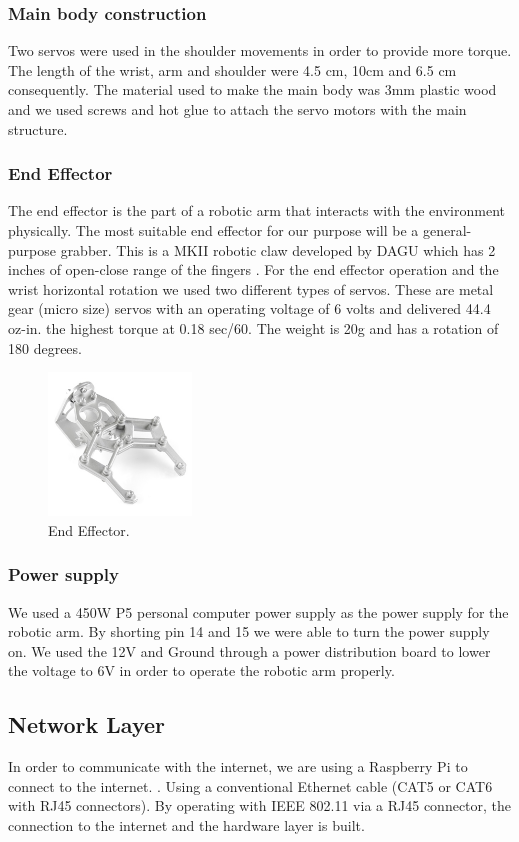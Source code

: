 \documentclass[conference]{IEEEtran}
\begin{document}
\subsubsection{Main body construction}
Two servos were used in the shoulder movements in order to provide more torque. The length of the wrist, arm and shoulder were 4.5 cm, 10cm and 6.5 cm consequently. The material used to make the main body was 3mm plastic wood and we used screws and hot glue to attach the servo motors with the main structure.

\subsubsection{End Effector}
The end effector is the part of a robotic arm that interacts with the environment physically. The most suitable end effector for our purpose will be a general-purpose grabber. This is a MKII robotic claw developed by DAGU which has 2 inches of open-close range of the fingers \cite{eightteen}. For the end effector operation and the wrist horizontal rotation we used two different types of servos. These are metal gear (micro size) servos with an operating voltage of 6 volts and delivered 44.4 oz-in. the highest torque at 0.18 sec/60. The weight is 20g and has a rotation of 180 degrees.
\begin{figure}[ht!] %
 \centering
 \includegraphics[width=1.5in]{Picture4.png}
 \caption{End Effector.}
 \label{endEffector}
 \end{figure}


\subsubsection{Power supply}
We used a 450W P5 personal computer power supply as the power supply for the robotic arm. By shorting pin 14 and 15 we were able to turn the power supply on. We used the 12V and Ground through a power distribution board to lower the voltage to 6V in order to operate the robotic arm properly.

\subsection{Network Layer}
In order to communicate with the internet, we are using a Raspberry Pi to connect to the internet. \cite{seventeen}. Using a conventional Ethernet cable (CAT5 or CAT6 with RJ45 connectors). By operating with IEEE 802.11 via a RJ45 connector, the connection to the internet and the hardware layer is built.
\end{document}
